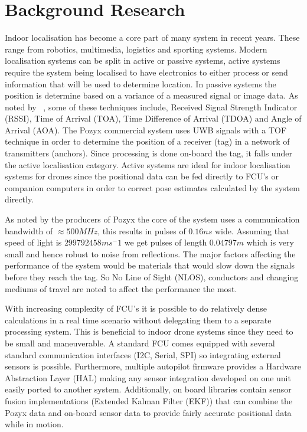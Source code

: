 \section{Background Research}\label{sec:background}
Indoor localisation has become a core part of many system in recent years.
These range from robotics, multimedia, logistics and sporting systems.
Modern localisation systems can be split in active or passive systems, active systems require the system being localised to have electronics to either process or send information that will be used to determine location.
In passive systems the position is determine  based on a variance of a measured signal or image data.
As noted by ~\cite{deak2012survey}, some of these techniques include, Received Signal Strength Indicator (RSSI), Time of Arrival (TOA), Time Difference of Arrival (TDOA) and Angle of Arrival (AOA).
The Pozyx commercial system uses UWB signals with a TOF technique in order to determine the position of a receiver (tag) in a network of transmitters (anchors).
Since processing is done on-board the tag, it falls under the active localisation category.
Active systems are ideal for indoor localisation systems for drones since the positional data can be fed directly to FCU's or companion computers in order to correct pose estimates calculated by the system directly.

As noted by the producers of Pozyx the core of the system uses a communication bandwidth of $\approx 500M Hz$, this results in pulses of $0.16ns$ wide.
Assuming that speed of light is $299792458ms^-1$ we get pulses of length $0.04797m$ which is very small and hence robust to noise from reflections.
The major factors affecting the performance of the system would be materials that would slow down the signals before they reach the tag.
So No Line of Sight (NLOS), conductors and changing mediums of travel are noted to affect the performance the most.

With increasing complexity of FCU's it is possible to do relatively dense calculations in a real time scenario without delegating them to a separate processing system.
This is beneficial to indoor drone systems since they need to be small and maneuverable.
A standard FCU comes equipped with several standard communication interfaces (I2C, Serial, SPI) so integrating external sensors is possible.
Furthermore, multiple autopilot firmware provides a Hardware Abstraction Layer (HAL) making any sensor integration developed on one unit easily ported to another system.
Additionally, on board libraries contain sensor fusion implementations (Extended Kalman Filter (EKF)) that can combine the Pozyx data and on-board sensor data to provide fairly accurate positional data while in motion.